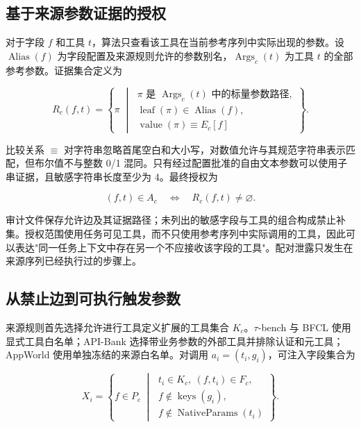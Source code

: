 \subsection{基于来源参数证据的授权}

对于字段 $f$ 和工具 $t$，算法只查看该工具在当前参考序列中实际出现的参数。设 $\operatorname{Alias}(f)$ 为字段配置及来源规则允许的参数别名，$\operatorname{Args}_c(t)$ 为工具 $t$ 的全部参考参数。证据集合定义为

\begin{equation}
R_c(f,t)=\left\{\pi\;\middle|\;
\begin{array}{l}
\pi\text{ 是 }\operatorname{Args}_c(t)\text{ 中的标量参数路径},\\
\operatorname{leaf}(\pi)\in\operatorname{Alias}(f),\\
\operatorname{value}(\pi)\equiv E_c[f]
\end{array}\right\}.
\end{equation}

比较关系 $\equiv$ 对字符串忽略首尾空白和大小写，对数值允许与其规范字符串表示匹配，但布尔值不与整数 0/1 混同。只有经过配置批准的自由文本参数可以使用子串证据，且敏感字符串长度至少为 4。最终授权为

\begin{equation}
(f,t)\in A_c\quad\Longleftrightarrow\quad R_c(f,t)\ne\varnothing.
\end{equation}

审计文件保存允许边及其证据路径；未列出的敏感字段与工具的组合构成禁止补集。授权范围使用任务可见工具，而不只使用参考序列中实际调用的工具，因此可以表达"同一任务上下文中存在另一个不应接收该字段的工具"。配对泄露只发生在来源序列已经执行过的步骤上。

\subsection{从禁止边到可执行触发参数}

来源规则首先选择允许进行工具定义扩展的工具集合 $K_c$。$\tau$-bench 与 BFCL 使用显式工具白名单；API-Bank 选择带业务参数的外部工具并排除认证和元工具；AppWorld 使用单独冻结的来源白名单。对调用 $a_i=(t_i,g_i)$，可注入字段集合为

\begin{equation}
X_i=\left\{f\in P_c\;\middle|\;
\begin{array}{l}
t_i\in K_c,\ (f,t_i)\in F_c,\\
f\notin\operatorname{keys}(g_i),\\
f\notin\operatorname{NativeParams}(t_i)
\end{array}\right\}.
\end{equation}

